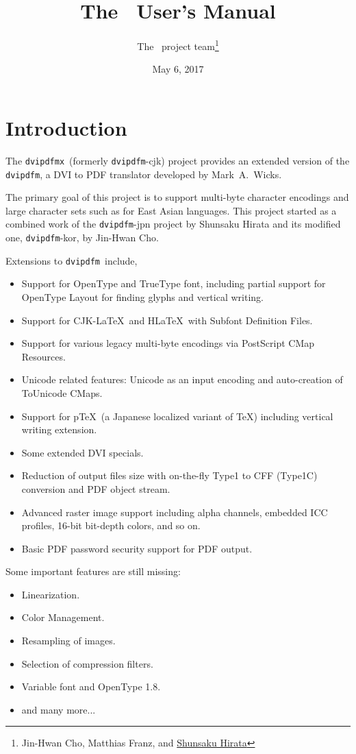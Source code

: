 \documentclass[a4paper,xetex]{article}
\title{The \dvipdfmx\ User's Manual}
\author{The \dvipdfmx\ project team\footnote{Jin-Hwan Cho, Matthias Franz,
and \href{mailto:shunsaku.hirata74@gmail.com}{Shunsaku Hirata}}}
\date{May 6, 2017}
\newcommand{\dvipdfm}{\texttt{dvipdfm}}
\newcommand{\dvipdfmx}{\texttt{dvipdfmx}}
\begin{document}
\maketitle

\section{Introduction}

The \dvipdfmx\ (formerly \dvipdfm-cjk) project
provides an extended version of the \dvipdfm, a DVI to PDF translator developed
by Mark~A.~Wicks.

The primary goal of this project is to support multi-byte character encodings
and large character sets such as for East Asian languages.
This project started as a combined work of the \dvipdfm-jpn project by
Shunsaku Hirata and its modified one, \dvipdfm-kor, by Jin-Hwan Cho.

Extensions to \dvipdfm\ include,
\begin{itemize}
    \item Support for OpenType and TrueType font, including partial support
    for OpenType Layout for finding glyphs and vertical writing.
    \item Support for CJK-\LaTeX\ and H\LaTeX\ with Subfont Definition Files.
    \item Support for various legacy multi-byte encodings via PostScript CMap
     Resources.
    \item Unicode related features: Unicode as an input encoding and
    auto-creation of ToUnicode CMaps.
    \item Support for p\TeX\ (a Japanese localized variant of \TeX) including
    vertical writing extension.
    \item Some extended DVI specials.
    \item Reduction of output files size with on-the-fly Type1 to CFF (Type1C)
    conversion and PDF object stream.
    \item Advanced raster image support including alpha channels, embedded
    ICC profiles, 16-bit bit-depth colors, and so on.
    \item Basic PDF password security support for PDF output.
\end{itemize}
Some important features are still missing:
\begin{itemize}
    \item Linearization.
    \item Color Management.
    \item Resampling of images.
    \item Selection of compression filters.
    \item Variable font and OpenType 1.8.
    \item and many more...
\end{itemize}
\end{document}
